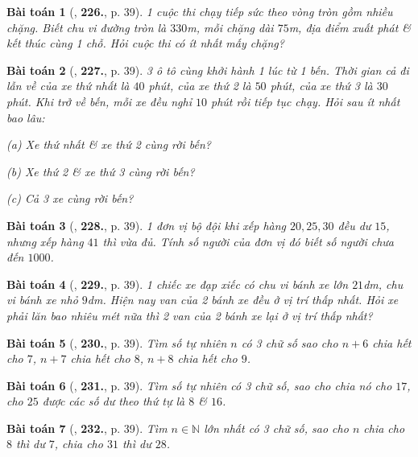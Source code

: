 \documentclass{article}
\numberwithin{equation}{section}
\newtheorem{baitoan}{Bài toán}[section]
\begin{document}
\begin{baitoan}[\cite{Binh_Toan_6_tap_1}, \textbf{226.}, p. 39]
	1 cuộc thi chạy tiếp sức theo vòng tròn gồm nhiều chặng. Biết chu vi đường tròn là $330$\emph{m}, mỗi chặng dài $75$\emph{m}, địa điểm xuất phát \& kết thúc cùng 1 chỗ. Hỏi cuộc thi có ít nhất mấy chặng?
\end{baitoan}

\begin{baitoan}[\cite{Binh_Toan_6_tap_1}, \textbf{227.}, p. 39]
	3 ô tô cùng khởi hành 1 lúc từ 1 bến. Thời gian cả đi lẫn về của xe thứ nhất là $40$ phút, của xe thứ 2 là $50$ phút, của xe thứ 3 là $30$ phút. Khi trở về bến, mỗi xe đều nghỉ $10$ phút rồi tiếp tục chạy. Hỏi sau ít nhất bao lâu:
	\begin{enumerate*}
		\item[(a)] Xe thứ nhất \& xe thứ 2 cùng rời bến?
		\item[(b)] Xe thứ 2 \& xe thứ 3 cùng rời bến?
		\item[(c)] Cả 3 xe cùng rời bến?
	\end{enumerate*}
\end{baitoan}

\begin{baitoan}[\cite{Binh_Toan_6_tap_1}, \textbf{228.}, p. 39]
	1 đơn vị bộ đội khi xếp hàng $20,25,30$ đều dư $15$, nhưng xếp hàng $41$ thì vừa đủ. Tính số người của đơn vị đó biết số người chưa đến $1000$.
\end{baitoan}

\begin{baitoan}[\cite{Binh_Toan_6_tap_1}, \textbf{229.}, p. 39]
	1 chiếc xe đạp xiếc có chu vi bánh xe lớn $21$\emph{dm}, chu vi bánh xe nhỏ $9$\emph{dm}. Hiện nay van của 2 bánh xe đều ở vị trí thấp nhất. Hỏi xe phải lăn bao nhiêu mét nữa thì 2 van của 2 bánh xe lại ở vị trí thấp nhất?
\end{baitoan}

\begin{baitoan}[\cite{Binh_Toan_6_tap_1}, \textbf{230.}, p. 39]
	Tìm số tự nhiên $n$ có 3 chữ số sao cho $n + 6$ chia hết cho $7$, $n + 7$ chia hết cho $8$, $n + 8$ chia hết cho $9$.
\end{baitoan}

\begin{baitoan}[\cite{Binh_Toan_6_tap_1}, \textbf{231.}, p. 39]
	Tìm số tự nhiên có 3 chữ số, sao cho chia nó cho $17$, cho $25$ được các số dư theo thứ tự là $8$ \& $16$.
\end{baitoan}

\begin{baitoan}[\cite{Binh_Toan_6_tap_1}, \textbf{232.}, p. 39]
	Tìm $n\in\mathbb{N}$ lớn nhất có 3 chữ số, sao cho $n$ chia cho $8$ thì dư $7$, chia cho $31$ thì dư $28$.
\end{baitoan}
\end{document}
